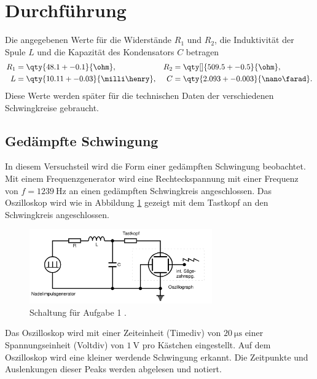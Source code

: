 \section{Durchführung}

Die angegebenen Werte für die Widerstände $R_1$ und $R_2$, die Induktivität der Spule $L$ und die Kapazität des Kondensators $C$ betragen
\begin{align*}
    R_1 &= \qty{48.1 +- 0.1 }{\ohm}, & R_2 &= \qty[]{509.5 +- 0.5}{\ohm}, \\
    L &= \qty{10.11 +- 0.03}{\milli \henry}, & C &= \qty{2.093 +- 0.003}{\nano \farad}.
\end{align*}
%
Diese Werte werden später für die technischen Daten der verschiedenen Schwingkreise gebraucht.

\subsection{Gedämpfte Schwingung}
In diesem Versuchsteil wird die Form einer gedämpften Schwingung beobachtet.
Mit einem Frequenzgenerator wird eine Rechteckspannung mit einer Frequenz von 
$f = \qty{1239}{\hertz}$ an einen gedämpften Schwingkreis angeschlossen.
Das Oszilloskop wird wie in Abbildung \ref{fig:Schaltung_a} gezeigt mit dem 
Tastkopf an den Schwingkreis angeschlossen.
\begin{figure}
    \centering
    \includegraphics[width=0.7\textwidth]{Abbildungen/Schaltung_a.png}
    \caption{Schaltung für Aufgabe 1 \cite{man:v354}.}
    \label{fig:Schaltung_a}
\end{figure}
Das Oszilloskop wird mit einer Zeiteinheit (Timediv) von $\qty{20}{\micro\s}$
einer Spannungseinheit (Voltdiv) von $\qty{1}{\volt}$ pro Kästchen eingestellt.
Auf dem Oszilloskop wird eine kleiner werdende Schwingung erkannt.
Die Zeitpunkte und Auslenkungen dieser Peaks werden abgelesen und notiert.

